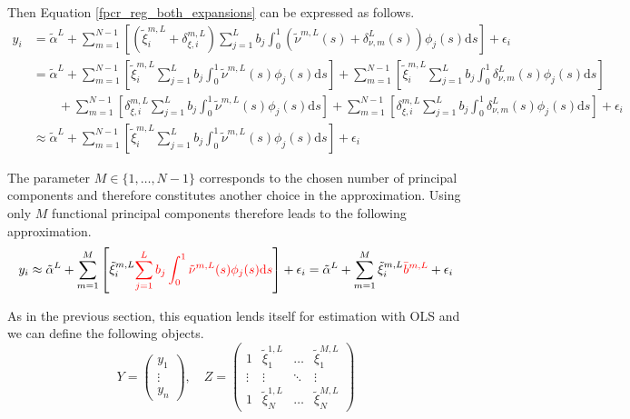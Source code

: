\documentclass[11pt,twoside,a4paper]{article}
\begin{document}
	Then Equation \ref{fpcr_reg_both_expansions} can be expressed as follows.
	\begin{equation}
		\begin{split}
			y_i & = \tilde{\alpha}^L
			+ \sum_{m = 1}^{N-1} \left[ \left(\tilde{\xi}^{m,L}_{i} + \delta_{\xi, i}^{m, L} \right) \sum_{j = 1}^{L} b_j \int_{0}^{1} \left(\tilde{\nu}^{m,L}(s) + \delta_{\nu, m}^L(s) \right) \phi_j(s) \mathrm{d}s \right] 
			+ \epsilon_i \\
			& = \tilde{\alpha}^L
			+ \sum_{m = 1}^{N-1} \left[ \tilde{\xi}^{m,L}_{i} \sum_{j = 1}^{L} b_j \int_{0}^{1} \tilde{\nu}^{m,L}(s) \phi_j(s) \mathrm{d}s \right] 
			+ \sum_{m = 1}^{N-1} \left[ \tilde{\xi}^{m,L}_{i} \sum_{j = 1}^{L} b_j \int_{0}^{1} \delta_{\nu, m}^L(s) \phi_j(s) \mathrm{d}s \right] \\
			& \quad \quad + \sum_{m = 1}^{N-1} \left[ \delta_{\xi, i}^{m, L} \sum_{j = 1}^{L} b_j \int_{0}^{1} \tilde{\nu}^{m,L}(s) \phi_j(s) \mathrm{d}s \right] 
			+ \sum_{m = 1}^{N-1} \left[ \delta_{\xi, i}^{m, L} \sum_{j = 1}^{L} b_j \int_{0}^{1} \delta_{\nu, m}^L(s) \phi_j(s) \mathrm{d}s \right]
			+ \epsilon_i \\
			& \approx \tilde{\alpha}^L
			+ \sum_{m = 1}^{N-1} \left[ \tilde{\xi}^{m,L}_{i} \sum_{j = 1}^{L} b_j \int_{0}^{1} \tilde{\nu}^{m,L}(s) \phi_j(s) \mathrm{d}s \right] + \epsilon_i
		\end{split}
	\end{equation}

	The parameter $M \in \{1, \dots, N-1\}$ corresponds to the chosen number of principal components and therefore constitutes another choice in the approximation. Using only $M$ functional principal components therefore leads to the following approximation.
	\begin{equation}
		y_i \approx \tilde{\alpha}^L
		+ \sum_{m = 1}^{M} \left[ \tilde{\xi}^{m,L}_{i} {\color{red}\sum_{j = 1}^{L} b_j \int_{0}^{1} \tilde{\nu}^{m,L}(s) \phi_j(s) \mathrm{d}s} \right] + \epsilon_i 
		= \tilde{\alpha}^L
		+ \sum_{m = 1}^{M} \tilde{\xi}^{m,L}_{i} {\color{red}\bar{b}^{m,L}} + \epsilon_i
	\end{equation}
	

	As in the previous section, this equation lends itself for estimation with OLS and we can define the following objects.
	\begin{equation}
		Y = \begin{pmatrix}
			y_1 \\ \vdots \\ y_n
		\end{pmatrix}, \quad
		Z = \begin{pmatrix}
			1 & \tilde{\xi}^{1,L}_{1} & \dots & \tilde{\xi}^{M,L}_{1} \\
			\vdots & \vdots & \ddots & \vdots \\
			1 & \tilde{\xi}^{1,L}_{N} & \dots & \tilde{\xi}^{M,L}_{N}
		\end{pmatrix}
	\end{equation}
	
\end{document}
